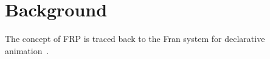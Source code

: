 \chapter{Background}
\label{chapter:Background}

The concept of FRP is traced back to the Fran system for declarative 
animation~\cite{Elliott1997}.